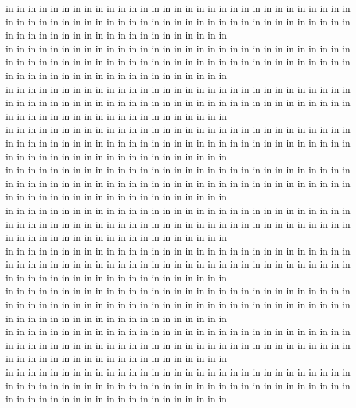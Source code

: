 in in in in in in in in in in in in in in in in in in in in in in in in in in in in in in in in in in in in in in in in in in in in in in in in in in in in in in in in in in in in in in in in in in in in in in in in in in in in in in in in in in\\
in in in in in in in in in in in in in in in in in in in in in in in in in in in in in in in in in in in in in in in in in in in in in in in in in in in in in in in in in in in in in in in in in in in in in in in in in in in in in in in in in in\\
in in in in in in in in in in in in in in in in in in in in in in in in in in in in in in in in in in in in in in in in in in in in in in in in in in in in in in in in in in in in in in in in in in in in in in in in in in in in in in in in in in\\
in in in in in in in in in in in in in in in in in in in in in in in in in in in in in in in in in in in in in in in in in in in in in in in in in in in in in in in in in in in in in in in in in in in in in in in in in in in in in in in in in in\\
in in in in in in in in in in in in in in in in in in in in in in in in in in in in in in in in in in in in in in in in in in in in in in in in in in in in in in in in in in in in in in in in in in in in in in in in in in in in in in in in in in\\
in in in in in in in in in in in in in in in in in in in in in in in in in in in in in in in in in in in in in in in in in in in in in in in in in in in in in in in in in in in in in in in in in in in in in in in in in in in in in in in in in in\\
in in in in in in in in in in in in in in in in in in in in in in in in in in in in in in in in in in in in in in in in in in in in in in in in in in in in in in in in in in in in in in in in in in in in in in in in in in in in in in in in in in\\
in in in in in in in in in in in in in in in in in in in in in in in in in in in in in in in in in in in in in in in in in in in in in in in in in in in in in in in in in in in in in in in in in in in in in in in in in in in in in in in in in in\\
in in in in in in in in in in in in in in in in in in in in in in in in in in in in in in in in in in in in in in in in in in in in in in in in in in in in in in in in in in in in in in in in in in in in in in in in in in in in in in in in in in\\
in in in in in in in in in in in in in in in in in in in in in in in in in in in in in in in in in in in in in in in in in in in in in in in in in in in in in in in in in in in in in in in in in in in in in in in in in in in in in in in in in in\\
